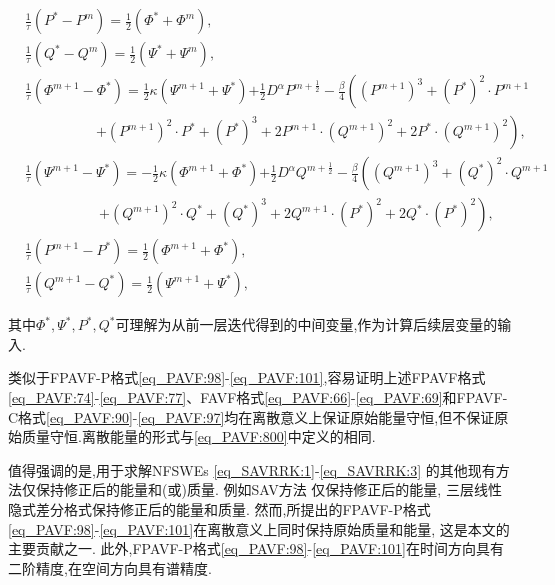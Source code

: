 \begin{enumerate}[$\bullet$]
\begin{align}
&\frac{1}{\tau}\left(P^{*}-P^{m}\right)=\frac{1}{2}(\varPhi^{*}+\varPhi^{m}),\label{eq_PAVF:92}\\
&\frac{1}{\tau}\left(Q^{*}-Q^{m}\right)=\frac{1}{2}(\Psi^{*}+\Psi^{m}),\label{eq_PAVF:93}\\
&\frac{1}{\tau}\left(\varPhi^{m+1}-\varPhi^{*}\right)=\frac{1}{2}\kappa (\Psi^{m+1}+\Psi^{*}){+\frac{1}{2}D^{\alpha} P^{m+\frac{1}{2}}}-\frac{\beta}{4}\left((P^{m+1})^3+(P^{*})^{2}\cdot P^{m+1}\right.\nonumber\\
		&~~~~~~~~~~~~~~~~~~~~~~~\left.+(P^{m+1})^{2}\cdot P^{*}+ (P^{*})^{3}+2 P^{m+1}\cdot (Q^{m+1})^{2}+2 P^{*}\cdot (Q^{m+1})^{2}\right),\label{eq_PAVF:94}\\
&\frac{1}{\tau}\left(\Psi^{m+1}-\Psi^{*}\right)=-\frac{1}{2}\kappa (\varPhi^{m+1}+\varPhi^{*}){+\frac{1}{2}D^{\alpha} Q^{m+\frac{1}{2}}}-\frac{\beta}{4}\left((Q^{m+1})^3+(Q^{*})^{2}\cdot Q^{m+1}\right.\nonumber\\
		&~~~~~~~~~~~~~~~~~~~~~~~~\left.+(Q^{m+1})^{2}\cdot Q^{*}+ (Q^{*})^{3}+2 Q^{m+1}\cdot (P^{*})^{2}+2 Q^{*}\cdot (P^{*})^{2}\right),\label{eq_PAVF:95}\\
&\frac{1}{\tau}\left(P^{m+1}-P^{*}\right)=\frac{1}{2}(\varPhi^{m+1}+\varPhi^{*}),\label{eq_PAVF:96}\\
&\frac{1}{\tau}\left(Q^{m+1}-Q^{*}\right)=\frac{1}{2}(\Psi^{m+1}+\Psi^{*}),\label{eq_PAVF:97}
\end{align}
\end{enumerate}
其中$\Phi^*, \Psi^*, P^*, Q^*$可理解为从前一层迭代得到的中间变量,作为计算后续层变量的输入.

\begin{remark}\label{rk_PAVF:1}
类似于FPAVF-P格式\eqref{eq_PAVF:98}-\eqref{eq_PAVF:101},容易证明上述FPAVF格式\eqref{eq_PAVF:74}-\eqref{eq_PAVF:77}、FAVF格式\eqref{eq_PAVF:66}-\eqref{eq_PAVF:69}和FPAVF-C格式\eqref{eq_PAVF:90}-\eqref{eq_PAVF:97}均在离散意义上保证原始能量守恒,但不保证原始质量守恒.离散能量的形式与\eqref{eq_PAVF:800}中定义的相同.
\end{remark}

\begin{remark}\label{rk_PAVF:2}
值得强调的是,用于求解NFSWEs \eqref{eq_SAVRRK:1}-\eqref{eq_SAVRRK:3} 的其他现有方法仅保持修正后的能量和(或)质量.
例如SAV方法 \cite{chengConvergenceEnergyconservingScheme2022}仅保持修正后的能量,
三层线性隐式差分格式\cite{ranLinearlyImplicitConservative2016}保持修正后的能量和质量.
然而,所提出的FPAVF-P格式\eqref{eq_PAVF:98}-\eqref{eq_PAVF:101}在离散意义上同时保持原始质量和能量, 这是本文的主要贡献之一.
此外,FPAVF-P格式\eqref{eq_PAVF:98}-\eqref{eq_PAVF:101}在时间方向具有二阶精度,在空间方向具有谱精度.
\end{remark}

